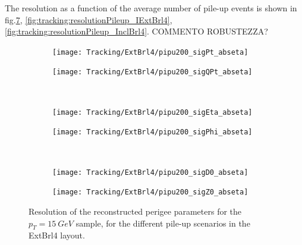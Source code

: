 \documentclass[a4paper,twoside,12pt]{article}
\begin{document}
The resolution as a function of the average number of pile-up events is shown in fig.\ref{fig:tracking:resolutionPileup_ExtBrl4}, \ref{fig:tracking:resolutionPileup_IExtBrl4}, \ref{fig:tracking:resolutionPileup_InclBrl4}. COMMENTO ROBUSTEZZA?\\

\begin{figure}
\begin{subfigure}{.5\linewidth}
\texttt{[image: Tracking/ExtBrl4/pipu200\_sigPt\_abseta]}
\caption{}
\label{fig:tracking:pi15_sigPt_abseta}
\end{subfigure}
\begin{subfigure}{.5\linewidth}
\texttt{[image: Tracking/ExtBrl4/pipu200\_sigQPt\_abseta]}
\caption{}
\label{fig:tracking:pi15_sigQPt_abseta_ExtBrl4}
\end{subfigure}\\[1ex]
\begin{subfigure}{.5\linewidth}
\texttt{[image: Tracking/ExtBrl4/pipu200\_sigEta\_abseta]}
\caption{}
\label{fig:tracking:pi15_sigEta_abseta_ExtBrl4}
\end{subfigure}
\begin{subfigure}{.5\linewidth}
\texttt{[image: Tracking/ExtBrl4/pipu200\_sigPhi\_abseta]}
\caption{}
\label{fig:tracking:pi15_sigPhi_abseta_ExtBrl4}
\end{subfigure}\\[1ex]
\begin{subfigure}{.5\linewidth}
\texttt{[image: Tracking/ExtBrl4/pipu200\_sigD0\_abseta]}
\caption{}
\label{fig:tracking:pi15_sigD0_abseta_ExtBrl4}
\end{subfigure}
\begin{subfigure}{.5\linewidth}
\texttt{[image: Tracking/ExtBrl4/pipu200\_sigZ0\_abseta]}
\caption{}
\label{fig:tracking:pi15_sigZ0_abseta_ExtBrl4}
\end{subfigure}
\caption{Resolution of the reconstructed perigee parameters for the $p_{T} = 15\ GeV$ sample, for the different pile-up scenarios in the ExtBrl4 layout.}
\label{fig:tracking:resolutionPileup_ExtBrl4}
\end{figure}
\end{document}
